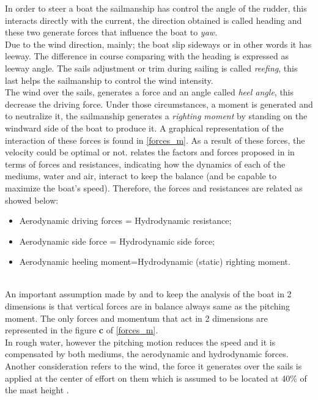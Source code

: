In order to steer a boat the sailmanship has control the angle of the rudder, this interacts directly with the current, the direction obtained is called heading and these two generate forces that influence the boat to \textit{yaw}. \\
Due to the wind direction, mainly; the boat slip sideways or in other words it has leeway. The difference in course comparing with the heading is expressed as leeway angle. The sails adjustment or trim during sailing is called \textit{reefing}, this last helps the sailmanship to control the wind intensity.  \\
The wind over the sails, generates a force and an angle called \textit{heel angle}, this decrease the driving force. Under those circumstances, a moment is generated and to neutralize it, the sailmanship generates a \textit{righting moment} by standing on the windward side of the boat to produce it\cite{philpott1993yacht}. A graphical representation of the interaction of these forces is  found in \ref{forces_m}.  As a result of these forces, the velocity could be optimal or not. \cite{larsonprinciples} relates the factors and forces proposed in\cite{philpott1993yacht} in terms of forces and resistances, indicating how the dynamics of each of the mediums, water and air, interact to keep the balance (and be capable to maximize the boat's speed). Therefore, the forces and resistances are related as showed below: 
\begin{itemize}  \label{milgramforces}
 \setlength \itemsep{0em}
\item Aerodynamic driving forces = Hydrodynamic resistance;
\item Aerodynamic side force = Hydrodynamic side force;
\item Aerodynamic heeling moment=Hydrodynamic (static) righting moment.
\end{itemize}
\\
An important assumption made by  \cite{philpott1993yacht} and \cite{larsonprinciples} to keep the analysis of the boat in 2 dimensions is that vertical forces are in balance always same as the pitching moment. The only forces and momentum that act in 2 dimensions are represented in the figure \textbf{c} of \ref{forces_m}. \\

In rough water, however the pitching motion reduces the speed and it is compensated by both mediums, the aerodynamic and hydrodynamic forces. Another consideration refers to the wind, the force it generates over the sails is applied at  the center of effort on them which is assumed to be located at 40\% of the mast height \cite{philpott1993yacht}. 

